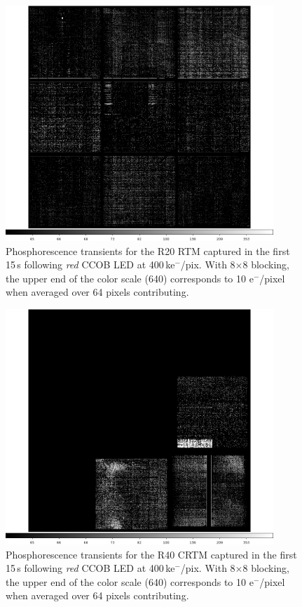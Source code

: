 \begin{figure}[!htbp]
\centering
\includegraphics[width=0.9\textwidth]{figures/phosphorescence-survey/itl_fluor_R20_0-19_rb1_log.png}
\caption{Phosphorescence transients for the R20 RTM captured in the first 15\,s following {\it red} CCOB LED at 400\,ke$^-$/pix. With 8$\times$8 blocking, the upper end of the color scale (640) corresponds to 10 e$^-$/pixel when averaged over 64 pixels contributing.}
\label{fig:phos:R20}
\end{figure}

\begin{figure}[!htbp]
\centering
\includegraphics[width=0.9\textwidth]{figures/phosphorescence-survey/itl_fluor_R40_0-19_rb1_log.png}
\caption{Phosphorescence transients for the R40 CRTM captured in the first 15\,s following {\it red} CCOB LED at 400\,ke$^-$/pix. With 8$\times$8 blocking, the upper end of the color scale (640) corresponds to 10 e$^-$/pixel when averaged over 64 pixels contributing.}
\label{fig:phos:R40}
\end{figure}

